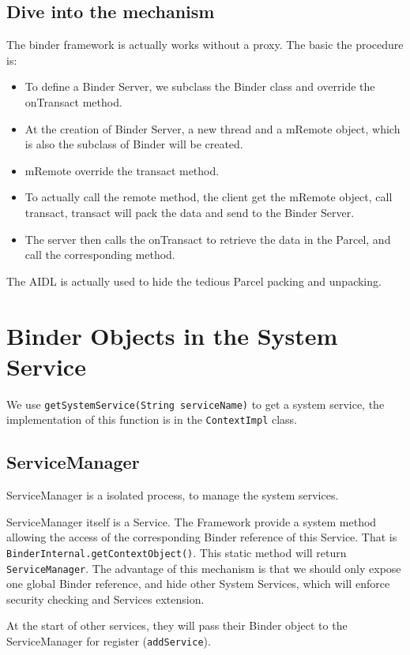 \documentclass[11pt, a4paper]{book}
\begin{document}
\subsection{Dive into the mechanism}
The binder framework is actually works without a proxy. The basic the procedure
is:
\begin{itemize}
    \item To define a Binder Server, we subclass the Binder class and
        override the onTransact method.
    \item At the creation of Binder Server, a new thread and a mRemote
        object, which is also the subclass of Binder will be created.
    \item mRemote override the transact method.
    \item To actually call the remote method, the client get the mRemote object,
        call transact, transact will pack the data and send to the Binder
        Server. 
    \item The server then calls the onTransact to retrieve the data in the
        Parcel, and call the corresponding method.
\end{itemize}

The AIDL is actually used to hide the tedious Parcel packing and unpacking.
\section{Binder Objects in the System Service}
We use \verb|getSystemService(String serviceName)| to get a system service, the
implementation of this function is in the \verb|ContextImpl| class.
\subsection{ServiceManager}
ServiceManager is a isolated process, to manage the system services.

ServiceManager itself is a Service. The Framework provide a system method
allowing the access of the corresponding Binder reference of this Service. That
is \verb|BinderInternal.getContextObject()|. This static method will return
\verb|ServiceManager|. The advantage of this mechanism is that we should only
expose one global Binder reference, and hide other System Services, which will
enforce security checking and Services extension.

At the start of other services, they will pass their Binder object to the
ServiceManager for register (\verb|addService|).
\end{document}
